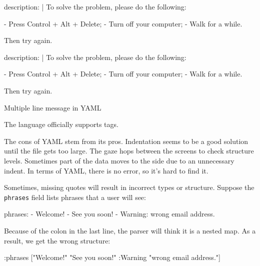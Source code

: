 \begin{listing}[ht!]

\ifx\DEVICETYPE\MOBILE

\begin{yaml}
description: |
  To solve the problem,
  please do the following:

  - Press Control + Alt + Delete;
  - Turn off your computer;
  - Walk for a while.

  Then try again.
\end{yaml}

\else

\begin{yaml}
description: |
  To solve the problem, please do the following:

  - Press Control + Alt + Delete;
  - Turn off your computer;
  - Walk for a while.

  Then try again.
\end{yaml}

\fi

\caption{ Multiple line message in YAML}
\label{fig:yaml-multi-line}

\end{listing}

The language officially supports tags.


The cons of YAML stem from its pros. Indentation seems to be a good solution until the file gets too large. The gaze hops between the screens to check structure levels. Sometimes part of the data moves to the side due to an unnecessary indent. In terms of YAML, there is no error, so it's hard to find it.

Sometimes, missing quotes will result in incorrect types or structure. Suppose the \verb|phrases| field lists phrases that a user will see:

\begin{yaml}
phrases:
  - Welcome!
  - See you soon!
  - Warning: wrong email address.
\end{yaml}

Because of the colon in the last line, the parser will think it is a nested map. As a result, we get the wrong structure:

\ifx\DEVICETYPE\MOBILE

\begin{clojure}
{:phrases
 ["Welcome!"
  "See you soon!"
  {:Warning "wrong email address."}]}
\end{clojure}

